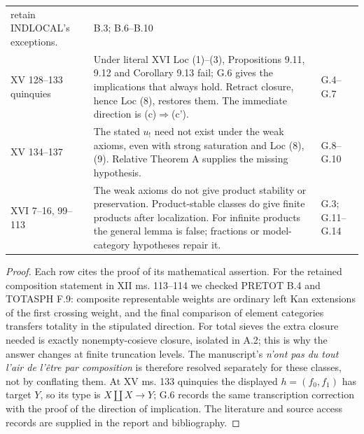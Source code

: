 \begin{center}
\begin{longtable}{p{25mm}p{101mm}p{20mm}}
retain INDLOCAL's exceptions.
& B.3; B.6--B.10\\
XV 128--133
quinquies & Under literal XVI Loc (1)--(3), Propositions 9.11,
9.12 and Corollary 9.13 fail; G.6 gives the implications that
always hold. Retract closure, hence Loc (8), restores them.
The immediate direction is (c)$\Rightarrow$(c').
& G.4--G.7\\
XV 134--137 & The stated $u_!$ need not exist under the weak
axioms, even with strong saturation and Loc (8),(9). Relative
Theorem A supplies the missing hypothesis.
& G.8--G.10\\
XVI 7--16,
99--113 & The weak axioms do not give product stability or
preservation. Product-stable classes do give finite products
after localization. For infinite products the general lemma
is false; fractions or model-category hypotheses repair it.
& G.3; G.11--G.14\\
\bottomrule
\end{longtable}
\end{center}
\begin{proof}
Each row cites the proof of its mathematical assertion. For the
retained composition statement in XII ms. 113--114 we checked
PRETOT B.4 and TOTASPH F.9: composite representable weights are
ordinary left Kan extensions of the first crossing weight, and
the final comparison of element categories transfers totality
in the stipulated direction. For total sieves the extra closure
needed is exactly nonempty-cosieve closure, isolated in A.2;
this is why the answer changes at finite truncation levels.
The manuscript's \emph{n'ont pas du tout l'air de l'\^etre par
composition} is therefore resolved separately for these classes,
not by conflating them. At XV ms. 133 quinquies the displayed
$h=(f_0,f_1)$ has target $Y$, so its type is $X\amalg X\to Y$;
G.6 records the same transcription correction with the proof
of the direction of implication. The literature and source
access records are supplied in the report and bibliography.
\end{proof}
